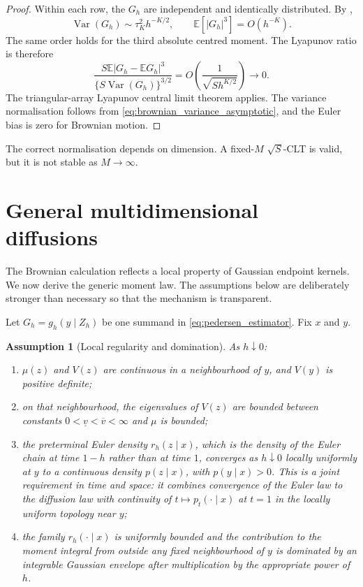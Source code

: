 \documentclass[11pt]{article}
\newtheorem{assumption}{Assumption}
\theoremstyle{definition}
\newcommand{\E}{\mathbb{E}}
\newcommand{\Var}{\operatorname{Var}}
\begin{document}
\begin{proof}
Within each row, the $G_h$ are independent and identically distributed. By ,
\[
\Var(G_h)\sim \tau_K^2 h^{-K/2},
\qquad
\E[|G_h|^3]=O(h^{-K}).
\]
The same order holds for the third absolute centred moment. The Lyapunov ratio is therefore
\[
\frac{S\E|G_h-\E G_h|^3}
{\{S\Var(G_h)\}^{3/2}}
=O\!\left(\frac{1}{\sqrt{S h^{K/2}}}\right)
\longrightarrow0.
\]
The triangular-array Lyapunov central limit theorem applies. The variance normalisation follows from \eqref{eq:brownian_variance_asymptotic}, and the Euler bias is zero for Brownian motion.
\end{proof}

The correct normalisation depends on dimension. A fixed-$M$ $\sqrt S$-CLT is valid, but it is not stable as $M\to\infty$.

\section{General multidimensional diffusions}\label{sec:general}

The Brownian calculation reflects a local property of Gaussian endpoint kernels. We now derive the generic moment law. The assumptions below are deliberately stronger than necessary so that the mechanism is transparent.

Let $G_h=g_h(y\mid Z_h)$ be one summand in \eqref{eq:pedersen_estimator}. Fix $x$ and $y$.

\begin{assumption}[Local regularity and domination]\label{ass:local}
As $h\downarrow0$:
\begin{enumerate}[label=(\roman*)]
\item $\mu(z)$ and $V(z)$ are continuous in a neighbourhood of $y$, and $V(y)$ is positive definite;
\item on that neighbourhood, the eigenvalues of $V(z)$ are bounded between constants $0<\underline v<\overline v<\infty$ and $\mu$ is bounded;
\item the preterminal Euler density $r_h(z\mid x)$, which is the density of the Euler chain at time $1-h$ rather than at time $1$, converges as $h\downarrow0$ locally uniformly at $y$ to a continuous density $p(z\mid x)$, with $p(y\mid x)>0$. This is a joint requirement in time and space: it combines convergence of the Euler law to the diffusion law with continuity of $t\mapsto p_t(\cdot\mid x)$ at $t=1$ in the locally uniform topology near $y$;
\item the family $r_h(\cdot\mid x)$ is uniformly bounded and the contribution to the moment integral from outside any fixed neighbourhood of $y$ is dominated by an integrable Gaussian envelope after multiplication by the appropriate power of $h$.
\end{enumerate}
\end{assumption}
\end{document}

